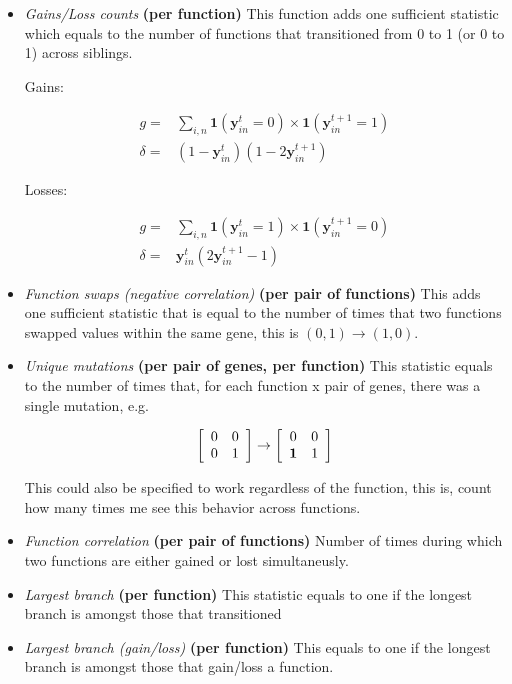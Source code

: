 \documentclass[11pt]{article}
\newcommand{\y}[2]{\mathbf{y}_{#1}^{#2}}
\newcommand{\one}[1]{\mathbf{1}\left(#1\right)}
\begin{document}
\begin{itemize}
\item \textit{Gains/Loss counts} \textbf{(per function)} This function adds one sufficient statistic which equals to the number of functions that transitioned from 0 to 1 (or 0 to 1) across siblings.

Gains:

\begin{align}
g = & \sum_{i,n}\one{\y{in}{t} =0}\times\one{\y{in}{t+1}=1} \\
\delta = & (1 - \y{in}{t})(1 - 2\y{in}{t+1})
\end{align}

Losses:

\begin{align}
g = & \sum_{i,n}\one{\y{in}{t} =1}\times\one{\y{in}{t+1}=0} \\
\delta = & \y{in}{t}(2\y{in}{t+1} - 1)
\end{align}



\item \textit{Function swaps (negative correlation)} \textbf{(per pair of functions)} This adds one sufficient statistic that is equal to the number of times that two functions swapped values within the same gene, this is $(0,1) \to (1, 0)$.

\item \textit{Unique mutations} \textbf{(per pair of genes, per function)} This statistic equals to the number of times that, for each function x pair of genes, there was a single mutation, e.g.

$$
\left[\begin{array}{cc}
0 & 0 \\
0 & 1
\end{array}\right] \to
\left[\begin{array}{cc}
0 & 0 \\
\text{\textbf{1}} & 1
\end{array}\right]
$$

This could also be specified to work regardless of the function, this is, count how many times me see this behavior across functions.

\item \textit{Function correlation} \textbf{(per pair of functions)} Number of times during which two functions are either gained or lost simultaneusly.

\item \textit{Largest branch} \textbf{(per function)} This statistic equals to one if the longest branch is amongst those that transitioned

\item \textit{Largest branch (gain/loss)} \textbf{(per function)} This equals to one if the longest branch is amongst those that gain/loss a function.
\end{itemize}
\end{document}
